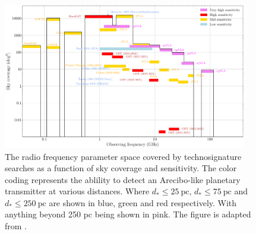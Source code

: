 \begin{figure}
    \centering
    \includegraphics[width=0.95\textwidth]{figs/SETI-Frequency-Parameter-Space.pdf}
    \caption{The radio frequency parameter space covered by technosignature searches as a function of sky coverage and sensitivity. The color coding represents the ablility to detect an Arecibo-like planetary transmitter at various distances. Where $d_* \leq 25 \ \text{pc}$, $d_* \leq 75 \ \text{pc}$ and $d_* \leq 250 \ \text{pc}$ are shown in blue, green and red respectively. With anything beyond 250 pc being shown in pink. The figure is adapted from \cite{ng_search_2022}.}
    \label{fig:SETI-Frequency-Parameter-Space}
\end{figure}



